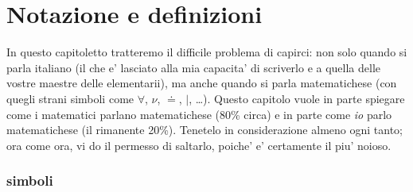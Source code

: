 \label{notazione}
\chapter{Notazione e definizioni}

In questo capitoletto tratteremo il difficile problema di capirci: non solo quando si parla italiano (il che e' lasciato
alla mia capacita' di scriverlo e a quella delle vostre maestre delle elementarii), ma anche quando si parla matematichese
(con quegli strani simboli come $\forall$, $\nu$, $\doteq$, $|$, \ldots). Questo capitolo vuole in parte spiegare come i
matematici parlano matematichese (80\% circa) e in parte come {\em io} parlo matematichese (il rimanente 20\%).
Tenetelo in considerazione almeno ogni tanto; ora come ora, vi do il permesso di saltarlo, poiche' e' certamente il piu' noioso.

\subsection{simboli}

